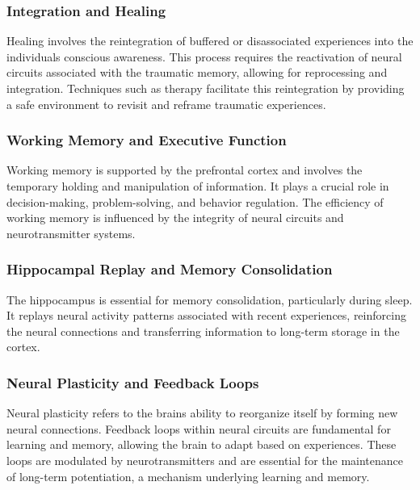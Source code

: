 \subsubsection{\texorpdfstring{\textbf{Integration and
Healing}}{Integration and Healing}}\label{integration-and-healing}

Healing involves the reintegration of buffered or disassociated
experiences into the individual\textquotesingle s conscious awareness.
This process requires the reactivation of neural circuits associated
with the traumatic memory, allowing for reprocessing and integration.
Techniques such as therapy facilitate this reintegration by providing a
safe environment to revisit and reframe traumatic experiences.

\subsubsection{\texorpdfstring{\textbf{Working Memory and Executive
Function}}{Working Memory and Executive Function}}\label{working-memory-and-executive-function}

Working memory is supported by the prefrontal cortex and involves the
temporary holding and manipulation of information. It plays a crucial
role in decision-making, problem-solving, and behavior regulation. The
efficiency of working memory is influenced by the integrity of neural
circuits and neurotransmitter systems.

\subsubsection{\texorpdfstring{\textbf{Hippocampal Replay and Memory
Consolidation}}{Hippocampal Replay and Memory Consolidation}}\label{hippocampal-replay-and-memory-consolidation}

The hippocampus is essential for memory consolidation, particularly
during sleep. It replays neural activity patterns associated with recent
experiences, reinforcing the neural connections and transferring
information to long-term storage in the cortex.

\subsubsection{\texorpdfstring{\textbf{Neural Plasticity and Feedback
Loops}}{Neural Plasticity and Feedback Loops}}\label{neural-plasticity-and-feedback-loops}

Neural plasticity refers to the brain\textquotesingle s ability to
reorganize itself by forming new neural connections. Feedback loops
within neural circuits are fundamental for learning and memory, allowing
the brain to adapt based on experiences. These loops are modulated by
neurotransmitters and are essential for the maintenance of long-term
potentiation, a mechanism underlying learning and memory.

